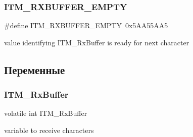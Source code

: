 \subsubsection{\texorpdfstring{ITM\_RXBUFFER\_EMPTY}{ITM\_RXBUFFER\_EMPTY}}
{\footnotesize\ttfamily \#define I\+T\+M\+\_\+\+R\+X\+B\+U\+F\+F\+E\+R\+\_\+\+E\+M\+P\+TY~0x5\+A\+A55\+A\+A5}

value identifying I\+T\+M\+\_\+\+Rx\+Buffer is ready for next character 

\subsection{Переменные}
\mbox{\label{group___c_m_s_i_s___c_m3___core_debug_interface_gacf1fe3063cedf11b6e6f7cb0dd7c1a51}} 
\subsubsection{\texorpdfstring{ITM\_RxBuffer}{ITM\_RxBuffer}}
{\footnotesize\ttfamily volatile int I\+T\+M\+\_\+\+Rx\+Buffer}

variable to receive characters ~\newline
 